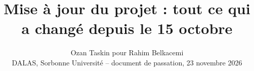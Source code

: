 \title{\vspace{-1.6cm}\textbf{Mise à jour du projet : tout ce qui a changé depuis le 15 octobre}}
\author{Ozan Taskin pour Rahim Belkacemi\\[2pt]
  \small DALAS, Sorbonne Université -- document de passation, 23 novembre 2026}
\date{\vspace{-1.0cm}}

